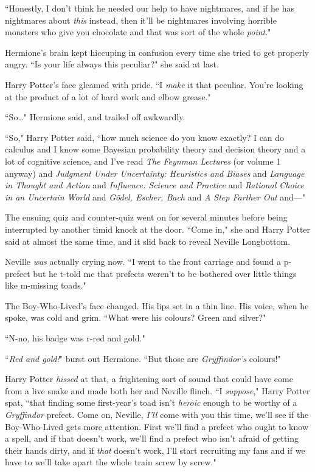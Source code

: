 ``Honestly, I don't think he needed our help to have nightmares, and if he has nightmares about \emph{this} instead, then it'll be nightmares involving horrible monsters who give you chocolate and that was sort of the whole \emph{point}."

Hermione's brain kept hiccuping in confusion every time she tried to get properly angry. ``Is your life always this peculiar?" she said at last.

Harry Potter's face gleamed with pride. ``I \emph{make} it that peculiar. You're looking at the product of a lot of hard work and elbow grease."

``So{\ldots}" Hermione said, and trailed off awkwardly.

``So," Harry Potter said, ``how much science do you know exactly? I can do calculus and I know some Bayesian probability theory and decision theory and a lot of cognitive science, and I've read \emph{The Feynman Lectures} (or volume 1 anyway) and \emph{Judgment Under Uncertainty: Heuristics and Biases} and \emph{Language in Thought and Action} and \emph{Influence: Science and Practice} and \emph{Rational Choice in an Uncertain World} and \emph{Gödel, Escher, Bach} and \emph{A Step Farther Out} and—"

The ensuing quiz and counter-quiz went on for several minutes before being interrupted by another timid knock at the door. ``Come in," she and Harry Potter said at almost the same time, and it slid back to reveal Neville Longbottom.

Neville \emph{was} actually crying now. ``I went to the front carriage and found a p-prefect but he t-told me that prefects weren't to be bothered over little things like m-missing toads."

The Boy-Who-Lived's face changed. His lips set in a thin line. His voice, when he spoke, was cold and grim. ``What were his colours? Green and silver?"

``N-no, his badge was r-red and gold."

``\emph{Red and gold!}" burst out Hermione. ``But those are \emph{Gryffindor's} colours!"

Harry Potter \emph{hissed} at that, a frightening sort of sound that could have come from a live snake and made both her and Neville flinch. ``I \emph{suppose}," Harry Potter spat, ``that finding some first-year's toad isn't \emph{heroic} enough to be worthy of a \emph{Gryffindor} prefect. Come on, Neville, \emph{I'll} come with you this time, we'll see if the Boy-Who-Lived gets more attention. First we'll find a prefect who ought to know a spell, and if that doesn't work, we'll find a prefect who isn't afraid of getting their hands dirty, and if \emph{that} doesn't work, I'll start recruiting my fans and if we have to we'll take apart the whole train screw by screw."

